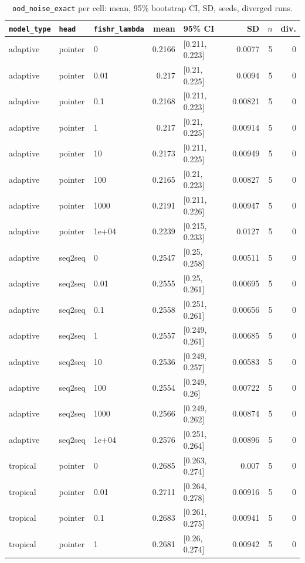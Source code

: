 \documentclass[10pt]{article}
\begin{document}
{\small
\begin{longtable}{lllrlrrr}
\caption{\texttt{ood\_noise\_exact} per cell: mean, 95\% bootstrap CI, SD, seeds, diverged runs.}\label{tab:summary-ood_noise_exact}\\
\toprule
\texttt{model\_type} & \texttt{head} & \texttt{fishr\_lambda} & mean & 95\% CI & SD & $n$ & div.\\
\midrule
\endhead
adaptive & pointer & 0 & 0.2166 & [0.211, 0.223] & 0.0077 & 5 & 0\\
adaptive & pointer & 0.01 & 0.217 & [0.21, 0.225] & 0.0094 & 5 & 0\\
adaptive & pointer & 0.1 & 0.2168 & [0.211, 0.223] & 0.00821 & 5 & 0\\
adaptive & pointer & 1 & 0.217 & [0.21, 0.225] & 0.00914 & 5 & 0\\
adaptive & pointer & 10 & 0.2173 & [0.211, 0.225] & 0.00949 & 5 & 0\\
adaptive & pointer & 100 & 0.2165 & [0.21, 0.223] & 0.00827 & 5 & 0\\
adaptive & pointer & 1000 & 0.2191 & [0.211, 0.226] & 0.00947 & 5 & 0\\
adaptive & pointer & 1e+04 & 0.2239 & [0.215, 0.233] & 0.0127 & 5 & 0\\
adaptive & seq2seq & 0 & 0.2547 & [0.25, 0.258] & 0.00511 & 5 & 0\\
adaptive & seq2seq & 0.01 & 0.2555 & [0.25, 0.261] & 0.00695 & 5 & 0\\
adaptive & seq2seq & 0.1 & 0.2558 & [0.251, 0.261] & 0.00656 & 5 & 0\\
adaptive & seq2seq & 1 & 0.2557 & [0.249, 0.261] & 0.00685 & 5 & 0\\
adaptive & seq2seq & 10 & 0.2536 & [0.249, 0.257] & 0.00583 & 5 & 0\\
adaptive & seq2seq & 100 & 0.2554 & [0.249, 0.26] & 0.00722 & 5 & 0\\
adaptive & seq2seq & 1000 & 0.2566 & [0.249, 0.262] & 0.00874 & 5 & 0\\
adaptive & seq2seq & 1e+04 & 0.2576 & [0.251, 0.264] & 0.00896 & 5 & 0\\
tropical & pointer & 0 & 0.2685 & [0.263, 0.274] & 0.007 & 5 & 0\\
tropical & pointer & 0.01 & 0.2711 & [0.264, 0.278] & 0.00916 & 5 & 0\\
tropical & pointer & 0.1 & 0.2683 & [0.261, 0.275] & 0.00941 & 5 & 0\\
tropical & pointer & 1 & 0.2681 & [0.26, 0.274] & 0.00942 & 5 & 0\\

\end{longtable}}
\end{document}
